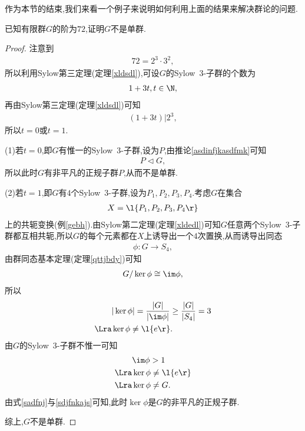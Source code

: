 作为本节的结束,我们来看一个例子来说明如何利用上面的结果来解决群论的问题.
\begin{example}\label{nvkkadv}
    已知有限群$G$的阶为$72$,证明$G$不是单群.
\end{example}
\begin{proof}
    注意到\begin{align*}
        72=2^3\cdot3^2,
    \end{align*}所以利用Sylow第三定理(定理\ref{xldsdl}),可设$G$的Sylow\ $3$-子群的个数为\begin{align*}
        1+3t,t\in\N,
    \end{align*}再由Sylow第三定理(定理\ref{xldsdl})可知\begin{align*}
        (1+3t)|2^3,
    \end{align*}所以$t=0$或$t=1$.

    (1)若$t=0$,即$G$有惟一的Sylow\ $3$-子群,设为$P$,由推论\ref{asdinfjkasdfmk}可知\begin{align*}
        P\lhd G,
    \end{align*}所以此时$G$有非平凡的正规子群$P$,从而不是单群.

    (2)若$t=1$,即$G$有$4$个Sylow\ $3$-子群,设为$P_1,P_2,P_3,P_4$.考虑$G$在集合\begin{align*}
        X=\l\{P_1,P_2,P_3,P_4\r\}
    \end{align*}上的共轭变换(例\ref{gebh}).由Sylow第二定理(定理\ref{xldedl})可知$G$任意两个Sylow\ $3$-子群都互相共轭,所以$G$的每个元素都在$X$上诱导出一个$4$次置换,从而诱导出同态\begin{align*}
        \phi:G\to S_4,
    \end{align*}由群同态基本定理(定理\ref{qttjbdy})可知\begin{align*}
        G/\ker\phi\cong\im\phi,
    \end{align*}所以\begin{align}
        &|\ker\phi|=\frac{|G|}{|\im\phi|}\geq\frac{|G|}{|S_4|}=3\nonumber\\
        \Lra&\ker\phi\neq\l\{e\r\}.\label{sadfnj}
    \end{align}由$G$的Sylow\ $3$-子群不惟一可知\begin{align}
        &\im\phi>1\nonumber\\
        \Lra&\ker\phi\neq\l\{e\r\}\nonumber\\
        \Lra&\ker\phi\neq G.\label{sdjfnkajs}
    \end{align}由式\eqref{sadfnj}与\eqref{sdjfnkajs}可知,此时$\ker\phi$是$G$的非平凡的正规子群.

    综上,$G$不是单群.
\end{proof}
